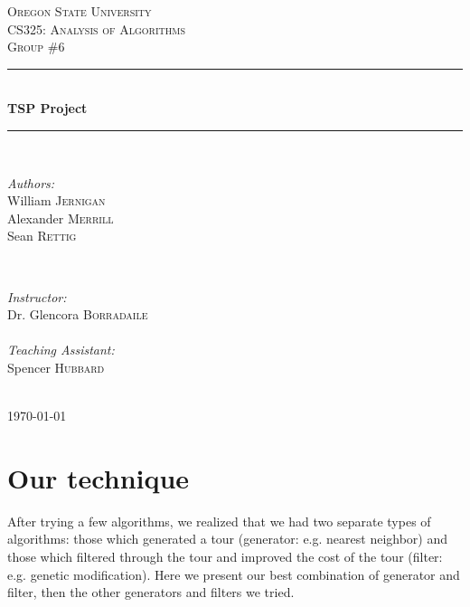 \documentclass{article}
\begin{document}
\begin{titlepage}

\newcommand{\HRule}{\rule{\linewidth}{0.5mm}} %

\center %
 
\textsc{\LARGE Oregon State University}\\[1.5cm] %
\textsc{\Large CS325: Analysis of Algorithms}\\[0.5cm] %
\textsc{\large Group \#6}\\[0.5cm] %

\HRule \\[0.4cm]
{ \huge \bfseries TSP Project}\\[0.4cm] %
\HRule \\[1.5cm]

\begin{minipage}{0.4\textwidth}
\begin{flushleft} \large
\emph{Authors:}\\
William \textsc{Jernigan}\\
Alexander \textsc{Merrill}\\
Sean \textsc{Rettig}
\end{flushleft}
\end{minipage}
~
\begin{minipage}{0.4\textwidth}
\begin{flushright} \large
\emph{Instructor:} \\
Dr. Glencora \textsc{Borradaile}\\
\emph{\\Teaching Assistant:} \\
Spencer \textsc{Hubbard}
\end{flushright}
\end{minipage}\\[4cm]

{\large \today}\\[3cm] %

\vfill %

\end{titlepage}
\part*{Our technique}
After trying a few algorithms, we realized that we had two separate types of algorithms: those which generated a tour (generator: e.g. nearest neighbor) and those which filtered through the tour and improved the cost of the tour (filter: e.g. genetic modification). Here we present our best combination of generator and filter, then the other generators and filters we tried.
\end{document}
